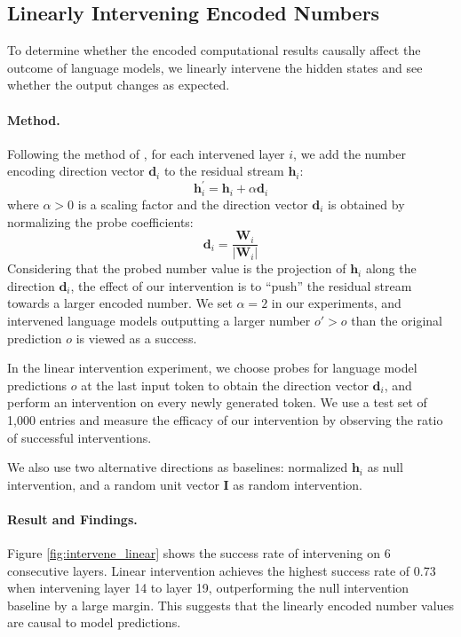 \documentclass[11pt]{article}
\begin{document}
\subsection{Linearly Intervening Encoded Numbers}
To determine whether the encoded computational results causally affect the outcome of language models, we linearly intervene the hidden states and see whether the output changes as expected.

\paragraph{Method.}
Following the method of \citet{nanda2023emergent}, for each intervened layer $i$, we add the number encoding direction vector $\mathbf{d}_i$ to the residual stream $\mathbf{h}_i$:
\begin{equation}
    \mathbf{h}_i^{'} = \mathbf{h}_i + \alpha \mathbf{d}_i
\end{equation}
where $\alpha > 0$ is a scaling factor and the direction vector $\mathbf{d}_i$ is obtained by normalizing the probe coefficients:
\begin{equation}
    \mathbf{d}_i = \frac{\mathbf{W}_i}{|\mathbf{W}_i|}
\end{equation}
Considering that the probed number value is the projection of $\mathbf{h}_i$ along the direction $\mathbf{d}_i$, the effect of our intervention is to ``push'' the residual stream towards a larger encoded number.
We set $\alpha = 2$ in our experiments, and intervened language models outputting a larger number $o' > o$ than the original prediction $o$ is viewed as a success.

In the linear intervention experiment, we choose probes for language model predictions $o$ at the last input token to obtain the direction vector $\mathbf{d}_i$, and perform an intervention on every newly generated token.
We use a test set of 1,000 entries and measure the efficacy of our intervention by observing the ratio of successful interventions.

We also use two alternative directions as baselines: normalized $\mathbf{h}_i$ as null intervention, and a random unit vector $\mathbf{I}$ as random intervention.

\paragraph{Result and Findings.}
Figure \ref{fig:intervene_linear} shows the success rate of intervening on 6 consecutive layers.
Linear intervention achieves the highest success rate of 0.73 when intervening layer 14 to layer 19, outperforming the null intervention baseline by a large margin.
This suggests that the linearly encoded number values are causal to model predictions.
\end{document}
